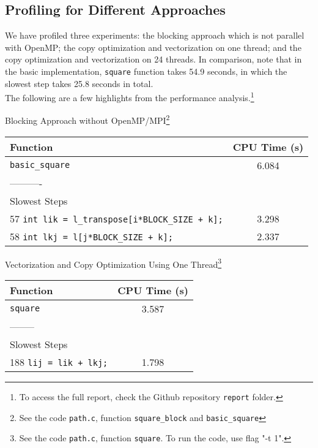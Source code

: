 \documentclass[12pt]{article}
\begin{document}
\subsection{Profiling for Different Approaches}
We have profiled three experiments: the blocking approach which is not parallel with OpenMP; the copy optimization and vectorization on one thread; and the copy optimization and vectorization on 24 threads. In comparison, note that in the basic implementation, \texttt{square} function takes 54.9 seconds, in which the slowest step takes 25.8 seconds in total.\\
The following are a few highlights from the performance analysis.\footnote{To access the full report, check the Github repository \texttt{report} folder.}
\bigskip
\begin{center}
	Blocking Approach without OpenMP/MPI\footnote{See the code \texttt{path.c}, function \texttt{square\_block} and \texttt{basic\_square}} \\
	\begin{tabular}{l|c}
		Function & CPU Time (s) \\ \hline
		\texttt{basic\_square} & 6.084 \\		
        ----------\\
        Slowest Steps\\
        57 \texttt{int lik = l\_transpose[i*BLOCK\_SIZE + k];} & 3.298 \\
        58 \texttt{int lkj = l[j*BLOCK\_SIZE + k];} & 2.337
	\end{tabular}
\end{center}

\bigskip
\begin{center}
	Vectorization and Copy Optimization Using One Thread\footnote{See the code \texttt{path.c}, function \texttt{square}. To run the code, use flag "-t 1".}
	\begin{tabular}{l|c}
		Function & CPU Time (s) \\ \hline
		\texttt{square} & 3.587 \\
		-------- \\       
		Slowest Steps \\
        188 \texttt{lij = lik + lkj;} & 1.798
	\end{tabular}
\end{center}
\end{document}
